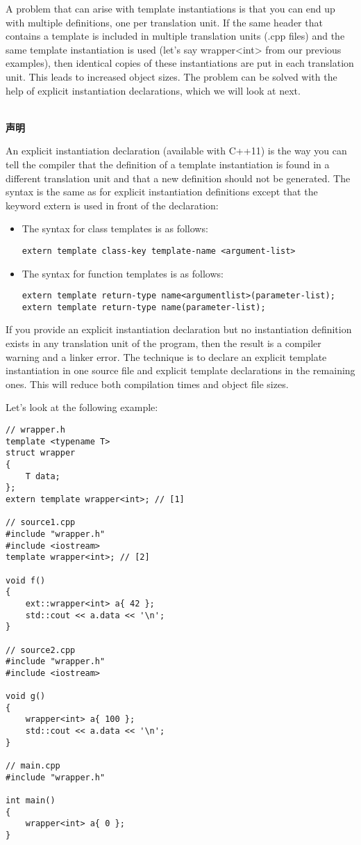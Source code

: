 A problem that can arise with template instantiations is that you can end up with multiple definitions, one per translation unit. If the same header that contains a template is included in multiple translation units (.cpp files) and the same template instantiation is used (let's say wrapper<int> from our previous examples), then identical copies of these instantiations are put in each translation unit. This leads to increased object sizes. The problem can be solved with the help of explicit instantiation declarations, which we will look at next.

\hspace*{\fill} \\ %
\noindent\textbf{声明}

An explicit instantiation declaration (available with C++11) is the way you can tell the compiler that the definition of a template instantiation is found in a different translation unit and that a new definition should not be generated. The syntax is the same as for explicit instantiation definitions except that the keyword extern is used in front of the declaration:

\begin{itemize}
\item 
The syntax for class templates is as follows:
\begin{lstlisting}[style=styleCXX]
extern template class-key template-name <argument-list>
\end{lstlisting}

\item 
The syntax for function templates is as follows:
\begin{lstlisting}[style=styleCXX]
extern template return-type name<argumentlist>(parameter-list);
extern template return-type name(parameter-list);
\end{lstlisting}
\end{itemize}

If you provide an explicit instantiation declaration but no instantiation definition exists in any translation unit of the program, then the result is a compiler warning and a linker error. The technique is to declare an explicit template instantiation in one source file and explicit template declarations in the remaining ones. This will reduce both compilation times and object file sizes.

Let's look at the following example:

\begin{lstlisting}[style=styleCXX]
// wrapper.h
template <typename T>
struct wrapper
{
	T data;
};
extern template wrapper<int>; // [1]

// source1.cpp
#include "wrapper.h"
#include <iostream>
template wrapper<int>; // [2]

void f()
{
	ext::wrapper<int> a{ 42 };
	std::cout << a.data << '\n';
}

// source2.cpp
#include "wrapper.h"
#include <iostream>

void g()
{
	wrapper<int> a{ 100 };
	std::cout << a.data << '\n';
}

// main.cpp
#include "wrapper.h"

int main()
{
	wrapper<int> a{ 0 };
}
\end{lstlisting}

